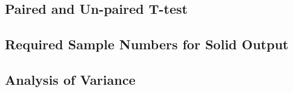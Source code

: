 \subsection{Paired and Un-paired T-test}

\subsection{Required Sample Numbers for Solid Output}

\subsection{Analysis of Variance}


